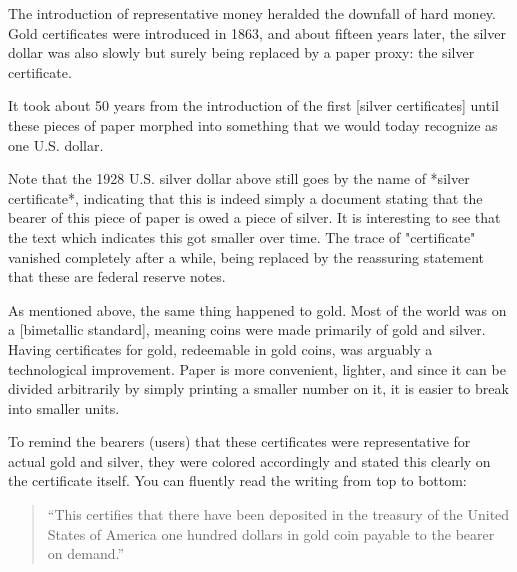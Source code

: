 
The introduction of representative money heralded the downfall of hard
money. Gold certificates were introduced in 1863, and about fifteen
years later, the silver dollar was also slowly but surely being replaced
by a paper proxy: the silver certificate.

It took about 50 years from the introduction of the first [silver
certificates] until these pieces of paper morphed into something that we
would today recognize as one U.S. dollar.


Note that the 1928 U.S. silver dollar above still goes by the name of
*silver certificate*, indicating that this is indeed simply a document
stating that the bearer of this piece of paper is owed a piece of
silver. It is interesting to see that the text which indicates this got
smaller over time. The trace of "certificate" vanished completely after
a while, being replaced by the reassuring statement that these are
federal reserve notes.

As mentioned above, the same thing happened to gold. Most of the world
was on a [bimetallic standard], meaning coins were made primarily of
gold and silver. Having certificates for gold, redeemable in gold coins,
was arguably a technological improvement. Paper is more convenient,
lighter, and since it can be divided arbitrarily by simply printing a
smaller number on it, it is easier to break into smaller units.

To remind the bearers (users) that these certificates were
representative for actual gold and silver, they were colored accordingly
and stated this clearly on the certificate itself. You can fluently read
the writing from top to bottom:

\begin{quotation}
``This certifies that there have been deposited in the treasury of the
United States of America one hundred dollars in gold coin payable to
the bearer on demand.''
\end{quotation}

